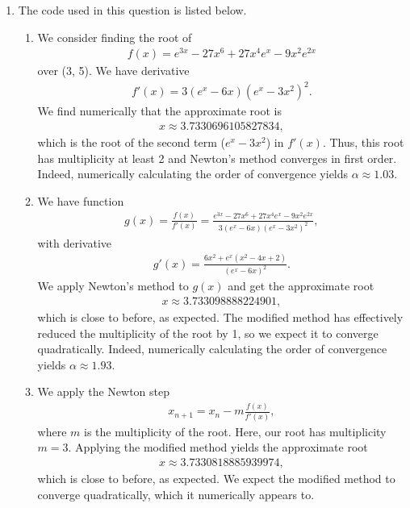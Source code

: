 \documentclass[10pt]{article}
\begin{document}
\begin{enumerate}
  \newpage

  \item The code used in this question is listed below.
  \begin{enumerate}
    \item We consider finding the root of \begin{align*}
        f(x) = e^{3x} - 27x^6 + 27x^4e^x - 9x^2e^{2x}
    \end{align*} over (3, 5). We have derivative \begin{align*}
        f'(x) = 3(e^x-6x)(e^x-3x^2)^2. 
    \end{align*} We find numerically that the approximate root is \begin{align*}
      x \approx 3.7330696105827834,
    \end{align*} which is the root of the second term (\(e^x-3x^2\)) in \(f'(x)\). Thus, this root has multiplicity at least 2 and Newton's method converges in first order. Indeed, numerically calculating the order of convergence yields \(\alpha \approx 1.03\).

    \item We have function \begin{align*}
        g(x) = \frac{f(x)}{f'(x)} = \frac{e^{3x} - 27x^6 + 27x^4e^x - 9x^2e^{2x}}{3(e^x-6x)(e^x-3x^2)^2},
    \end{align*} with derivative \begin{align*}
        g'(x) = \frac{6x^2 + e^x(x^2-4x+2)}{(e^x-6x)^2}.
    \end{align*} We apply Newton's method to \(g(x)\) and get the approximate root \begin{align*}
        x \approx 3.733098888224901,
    \end{align*} which is close to before, as expected. The modified method has effectively reduced the multiplicity of the root by 1, so we expect it to converge quadratically. Indeed, numerically calculating the order of convergence yields \(\alpha \approx 1.93\).

    \item We apply the Newton step \begin{align*}
        x_{n+1} = x_{n} - m\frac{f(x)}{f'(x)},
    \end{align*} where \(m\) is the multiplicity of the root. Here, our root has multiplicity \(m=3\). Applying the modified method yields the approximate root \begin{align*}
        x \approx 3.7330818885939974,
    \end{align*} which is close to before, as expected. We expect the modified method to converge quadratically, which it numerically appears to.


\end{enumerate}
\end{enumerate}
\end{document}
